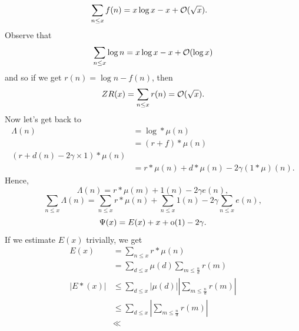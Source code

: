 \documentclass[12pt]{article}
\begin{document}
{\begin{align*}
        \sum_{n\leq x}f(n)&=x\log x-x+\mathcal{O}(\sqrt{x}).
    \end{align*}
    Observe that
    \[
        \sum_{n\leq x}\log n=x\log x-x+\mathcal{O}(\log x)
    \]
    and so if we get $r(n)=\log n-f(n)$, then 
    \[Z
        R(x)=\sum_{n\leq x}r(n)=\mathcal{O}(\sqrt{x}).
    \]
    Now let's get back to
    \begin{align*}
        \Lambda(n)&=\log\ast\mu(n)\\
        &=(r+f)\ast\mu(n)\\
        (r+d(n)-2\gamma\times1)\ast\mu(n)\\
        &=r\ast\mu(n)+d\ast\mu(n)-2\gamma(1\ast\mu)(n).
    \end{align*}
    Hence, 
    \[
        \Lambda(n)=r\ast\mu(m)+1(n)-2\gamma e(n),
    \]
    \[
        \sum_{n\leq x}\Lambda(n)=\sum_{n\leq x}r\ast\mu(n)+\sum_{n\leq x}1(n)-2\gamma\sum_{n\leq x}e(n),
    \]
    \[
        \Psi(x)=E(x)+x+\text{o}(1)-2\gamma.
    \]
    If we estimate $E(x)$ trivially, we get
    \begin{align*}
        E(x)&=\sum_{n\leq x}r\ast\mu(n)\\
        &=\sum_{d\leq x}\mu(d)\sum_{m\leq\frac{n}{d}}r(m)\\
        |E*(x)|&\leq\sum_{d\leq x}|\mu(d)|\left|\sum_{m\leq\frac{n}{d}}r(m)\right|\\
        &\leq\sum_{d\leq x}\left|\sum_{m\leq\frac{n}{d}}r(m)\right|\\
        &\ll
    \end{align*}
}
\end{document}
